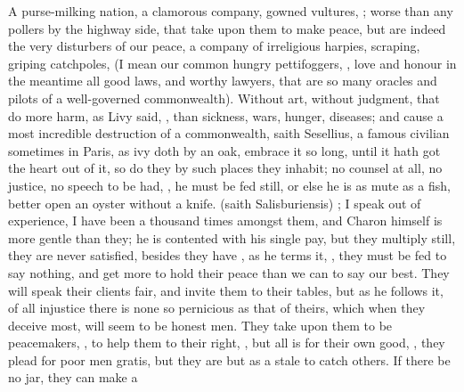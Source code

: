 {A purse-milking nation, a clamorous company, gowned vultures, ; worse than any pollers by the highway side,  that take
upon them to make peace, but are indeed the very disturbers of our
peace, a company of irreligious harpies, scraping, griping catchpoles,
(I mean our common hungry pettifoggers, , love and
honour in the meantime all good laws, and worthy lawyers, that are so
many oracles and pilots of a well-governed commonwealth). Without
art, without judgment, that do more harm, as Livy said, , than sickness, wars, hunger, diseases; and
cause a most incredible destruction of a commonwealth, saith
Sesellius, a famous civilian sometimes in Paris, as ivy doth by an
oak, embrace it so long, until it hath got the heart out of it, so do
they by such places they inhabit; no counsel at all, no justice, no
speech to be had, , he must be fed still, or else
he is as mute as a fish, better open an oyster without a knife.  (saith  Salisburiensis) ; I
speak out of experience, I have been a thousand times amongst them, and
Charon himself is more gentle than they; he is contented with his
single pay, but they multiply still, they are never satisfied, besides
they have , as he terms it, , they must be fed to say nothing, and get more to hold
their peace than we can to say our best. They will speak their clients
fair, and invite them to their tables, but as he follows it, of
all injustice there is none so pernicious as that of theirs, which when
they deceive most, will seem to be honest men. They take upon them to
be peacemakers, , to help them to their right,
, but all is for their own good, , they plead for poor men gratis, but they are but
as a stale to catch others. If there be no jar, they can make a
}
